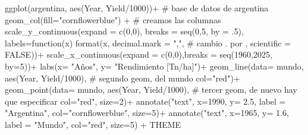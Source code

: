 \documentclass[
  letterpaper,
  DIV=11,
  numbers=noendperiod]{scrartcl}
\newenvironment{Shaded}{\begin{snugshade}}{\end{snugshade}}
\newcommand{\AttributeTok}[1]{\textcolor[rgb]{0.40,0.45,0.13}{#1}}
\newcommand{\CommentTok}[1]{\textcolor[rgb]{0.37,0.37,0.37}{#1}}
\newcommand{\ConstantTok}[1]{\textcolor[rgb]{0.56,0.35,0.01}{#1}}
\newcommand{\ControlFlowTok}[1]{\textcolor[rgb]{0.00,0.23,0.31}{#1}}
\newcommand{\DecValTok}[1]{\textcolor[rgb]{0.68,0.00,0.00}{#1}}
\newcommand{\FloatTok}[1]{\textcolor[rgb]{0.68,0.00,0.00}{#1}}
\newcommand{\FunctionTok}[1]{\textcolor[rgb]{0.28,0.35,0.67}{#1}}
\newcommand{\NormalTok}[1]{\textcolor[rgb]{0.00,0.23,0.31}{#1}}
\newcommand{\SpecialCharTok}[1]{\textcolor[rgb]{0.37,0.37,0.37}{#1}}
\newcommand{\StringTok}[1]{\textcolor[rgb]{0.13,0.47,0.30}{#1}}
\begin{document}
\begin{Shaded}
\begin{Highlighting}[]
\FunctionTok{ggplot}\NormalTok{(argentina, }\FunctionTok{aes}\NormalTok{(Year, Yield}\SpecialCharTok{/}\DecValTok{1000}\NormalTok{))}\SpecialCharTok{+} \CommentTok{\# base de datos de argentina}
  \FunctionTok{geom\_col}\NormalTok{(}\AttributeTok{fill=}\StringTok{"cornflowerblue"}\NormalTok{) }\SpecialCharTok{+}  \CommentTok{\# creamos las columnas}
  \FunctionTok{scale\_y\_continuous}\NormalTok{(}\AttributeTok{expand =} \FunctionTok{c}\NormalTok{(}\DecValTok{0}\NormalTok{,}\DecValTok{0}\NormalTok{), }\AttributeTok{breaks =} \FunctionTok{seq}\NormalTok{(}\DecValTok{0}\NormalTok{,}\DecValTok{5}\NormalTok{, }\AttributeTok{by =}\NormalTok{ .}\DecValTok{5}\NormalTok{),}
                     \AttributeTok{labels=}\ControlFlowTok{function}\NormalTok{(x) }\FunctionTok{format}\NormalTok{(x, }\AttributeTok{decimal.mark =} \StringTok{","}\NormalTok{, }\CommentTok{\# cambio . por ,}
                                               \AttributeTok{scientific =} \ConstantTok{FALSE}\NormalTok{))}\SpecialCharTok{+}
  \FunctionTok{scale\_x\_continuous}\NormalTok{(}\AttributeTok{expand =} \FunctionTok{c}\NormalTok{(}\DecValTok{0}\NormalTok{,}\DecValTok{0}\NormalTok{),}\AttributeTok{breaks =} \FunctionTok{seq}\NormalTok{(}\DecValTok{1960}\NormalTok{,}\DecValTok{2025}\NormalTok{, }\AttributeTok{by=}\DecValTok{5}\NormalTok{))}\SpecialCharTok{+}
  \FunctionTok{labs}\NormalTok{(}\AttributeTok{x=} \StringTok{"Años"}\NormalTok{,}
       \AttributeTok{y=} \StringTok{"Rendimiento [Tn/ha]"}\NormalTok{)}\SpecialCharTok{+}
  \FunctionTok{geom\_line}\NormalTok{(}\AttributeTok{data=}\NormalTok{ mundo, }\FunctionTok{aes}\NormalTok{(Year, Yield}\SpecialCharTok{/}\DecValTok{1000}\NormalTok{), }\CommentTok{\# segundo geom, del mundo}
            \AttributeTok{col=}\StringTok{"red"}\NormalTok{)}\SpecialCharTok{+}
  \FunctionTok{geom\_point}\NormalTok{(}\AttributeTok{data=}\NormalTok{ mundo, }\FunctionTok{aes}\NormalTok{(Year, Yield}\SpecialCharTok{/}\DecValTok{1000}\NormalTok{), }\CommentTok{\# tercer geom, de nuevo hay que especificar}
            \AttributeTok{col=}\StringTok{"red"}\NormalTok{, }\AttributeTok{size=}\DecValTok{2}\NormalTok{)}\SpecialCharTok{+}
  \FunctionTok{annotate}\NormalTok{(}\StringTok{"text"}\NormalTok{, }\AttributeTok{x=}\DecValTok{1990}\NormalTok{, }\AttributeTok{y=} \FloatTok{2.5}\NormalTok{, }\AttributeTok{label =} \StringTok{"Argentina"}\NormalTok{, }\AttributeTok{col=}\StringTok{"cornflowerblue"}\NormalTok{, }\AttributeTok{size=}\DecValTok{5}\NormalTok{)}\SpecialCharTok{+}
  \FunctionTok{annotate}\NormalTok{(}\StringTok{"text"}\NormalTok{, }\AttributeTok{x=}\DecValTok{1965}\NormalTok{, }\AttributeTok{y=} \FloatTok{1.6}\NormalTok{, }\AttributeTok{label =} \StringTok{"Mundo"}\NormalTok{, }\AttributeTok{col=}\StringTok{"red"}\NormalTok{, }\AttributeTok{size=}\DecValTok{5}\NormalTok{) }\SpecialCharTok{+}
\NormalTok{  THEME}
\end{Highlighting}
\end{Shaded}
\end{document}
